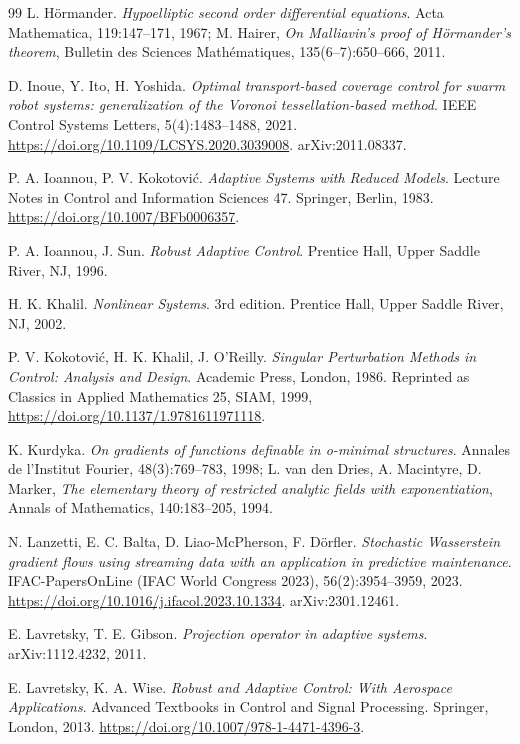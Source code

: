 \begin{thebibliography}{99}
L. H\"ormander.
\emph{Hypoelliptic second order differential equations}.
Acta Mathematica, 119:147--171, 1967;
M. Hairer, \emph{On Malliavin's proof of H\"ormander's theorem}, Bulletin des Sciences Math\'ematiques,
135(6--7):650--666, 2011.

D. Inoue, Y. Ito, H. Yoshida.
\emph{Optimal transport-based coverage control for swarm robot systems: generalization of the Voronoi
tessellation-based method}.
IEEE Control Systems Letters, 5(4):1483--1488, 2021.
\url{https://doi.org/10.1109/LCSYS.2020.3039008}.
arXiv:2011.08337.

P. A. Ioannou, P. V. Kokotovi\'c.
\emph{Adaptive Systems with Reduced Models}.
Lecture Notes in Control and Information Sciences 47. Springer, Berlin, 1983.
\url{https://doi.org/10.1007/BFb0006357}.

P. A. Ioannou, J. Sun.
\emph{Robust Adaptive Control}.
Prentice Hall, Upper Saddle River, NJ, 1996.

H. K. Khalil.
\emph{Nonlinear Systems}.
3rd edition. Prentice Hall, Upper Saddle River, NJ, 2002.

P. V. Kokotovi\'c, H. K. Khalil, J. O'Reilly.
\emph{Singular Perturbation Methods in Control: Analysis and Design}.
Academic Press, London, 1986. Reprinted as Classics in Applied Mathematics 25, SIAM, 1999,
\url{https://doi.org/10.1137/1.9781611971118}.

K. Kurdyka.
\emph{On gradients of functions definable in o-minimal structures}.
Annales de l'Institut Fourier, 48(3):769--783, 1998;
L. van den Dries, A. Macintyre, D. Marker, \emph{The elementary theory of restricted analytic fields with
exponentiation}, Annals of Mathematics, 140:183--205, 1994.

N. Lanzetti, E. C. Balta, D. Liao-McPherson, F. D\"orfler.
\emph{Stochastic Wasserstein gradient flows using streaming data with an application in predictive maintenance}.
IFAC-PapersOnLine (IFAC World Congress 2023), 56(2):3954--3959, 2023.
\url{https://doi.org/10.1016/j.ifacol.2023.10.1334}.
arXiv:2301.12461.

E. Lavretsky, T. E. Gibson.
\emph{Projection operator in adaptive systems}.
arXiv:1112.4232, 2011.

E. Lavretsky, K. A. Wise.
\emph{Robust and Adaptive Control: With Aerospace Applications}.
Advanced Textbooks in Control and Signal Processing. Springer, London, 2013.
\url{https://doi.org/10.1007/978-1-4471-4396-3}.


\end{thebibliography}
